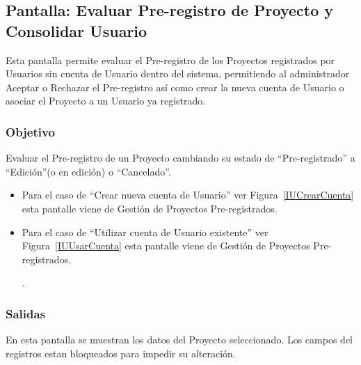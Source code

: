 \subsection{Pantalla: Evaluar Pre-registro de Proyecto y Consolidar Usuario}
Esta pantalla permite evaluar el Pre-registro de los Proyectos registrados por Usuarios sin cuenta de Usuario dentro del sistema, permitiendo al administrador Aceptar o Rechazar el Pre-registro así como crear la nueva cuenta de Usuario o asociar el Proyecto a un Usuario ya registrado.

\subsubsection{Objetivo}
 Evaluar el Pre-registro de un Proyecto cambiando su estado de ``Pre-registrado'' a ``Edición''(o en edición) o ``Cancelado''.
\begin{itemize}
\item Para el caso de ``Crear nueva cuenta de Usuario'' ver Figura~\ref{IUCrearCuenta} esta pantalle viene de Gestión de Proyectos Pre-registrados.


\item Para el caso de ``Utilizar cuenta de Usuario existente'' ver Figura~\ref{IUUsarCuenta} esta pantalle viene de Gestión de Proyectos Pre-registrados.

.

\end{itemize}

\subsubsection{Salidas}
En esta pantalla se muestran los datos del Proyecto seleccionado. Los campos del registros estan bloqueados para impedir su alteración.

